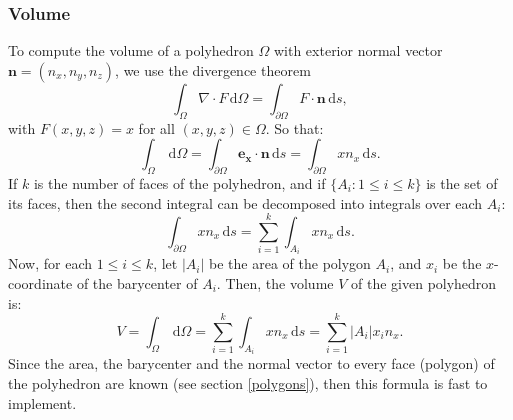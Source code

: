 \subsubsection{Volume}
To compute the volume of a polyhedron $\Omega$ with exterior normal vector $\mathbf{n}=(n_x,n_y,n_z)$, we use the divergence theorem
$$ \int_\Omega \nabla \cdot F \, \mathrm{d}\Omega=\int_{\partial\Omega}F \cdot\mathbf{n}
\, \mathrm{d}s, $$
with $F(x,y,z) = x$ for all $(x,y,z)\in \Omega$. So that:
$$
\int_\Omega \, \mathrm{d}\Omega=\int_{\partial\Omega} \mathbf{e_x} \cdot \mathbf{n} \, \mathrm{d}s =\int_{\partial\Omega} x  n_x \, \mathrm{d}s.
$$
If $k$ is the number of faces of the polyhedron, and if $\{A_i : 1\leq i\leq k\}$ is the set of its faces, then the second integral can be decomposed into integrals over each $A_i$:
$$ \int_{\partial\Omega} x n_x \, \mathrm{d}s=\sum_{i=1}^k \int_{A_i} x n_x \, \mathrm{d}s.$$
Now, for each $1\leq i\leq k$, let $|A_i|$ be the area of the polygon $A_i$, and $x_i$ be the $x$-coordinate of the barycenter of $A_i$. Then, the volume $V$ of the given polyhedron is:
$$
V = \int_\Omega \, \mathrm{d}\Omega = \sum_{i=1}^k \int_{A_i} x n_x \, \mathrm{d}s = \sum_{i=1}^k |A_i|x_in_x.
$$
Since the area, the barycenter and the normal vector to every face (polygon) of the polyhedron are known (see section \ref{polygons}), then this formula is fast to implement.

